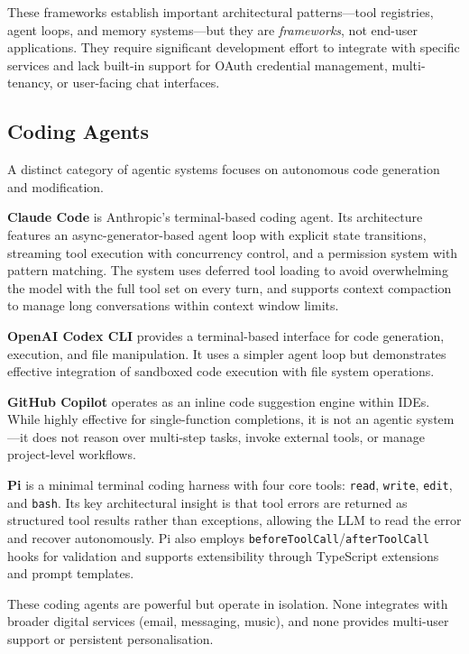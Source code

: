These frameworks establish important architectural patterns---tool registries, agent loops, and memory systems---but they are \textit{frameworks}, not end-user applications. They require significant development effort to integrate with specific services and lack built-in support for OAuth credential management, multi-tenancy, or user-facing chat interfaces.

\subsection{Coding Agents}

A distinct category of agentic systems focuses on autonomous code generation and modification.

\textbf{Claude Code} \cite{anthropic2025claudecode} is Anthropic's terminal-based coding agent. Its architecture features an async-generator-based agent loop with explicit state transitions, streaming tool execution with concurrency control, and a permission system with pattern matching. The system uses deferred tool loading to avoid overwhelming the model with the full tool set on every turn, and supports context compaction to manage long conversations within context window limits.

\textbf{OpenAI Codex CLI} \cite{openai2025codexcli} provides a terminal-based interface for code generation, execution, and file manipulation. It uses a simpler agent loop but demonstrates effective integration of sandboxed code execution with file system operations.

\textbf{GitHub Copilot} \cite{github2024copilot} operates as an inline code suggestion engine within IDEs. While highly effective for single-function completions, it is not an agentic system---it does not reason over multi-step tasks, invoke external tools, or manage project-level workflows.

\textbf{Pi} \cite{badlogic2025pi} is a minimal terminal coding harness with four core tools: \texttt{read}, \texttt{write}, \texttt{edit}, and \texttt{bash}. Its key architectural insight is that tool errors are returned as structured tool results rather than exceptions, allowing the LLM to read the error and recover autonomously. Pi also employs \texttt{beforeToolCall}/\texttt{afterToolCall} hooks for validation and supports extensibility through TypeScript extensions and prompt templates.

These coding agents are powerful but operate in isolation. None integrates with broader digital services (email, messaging, music), and none provides multi-user support or persistent personalisation.

